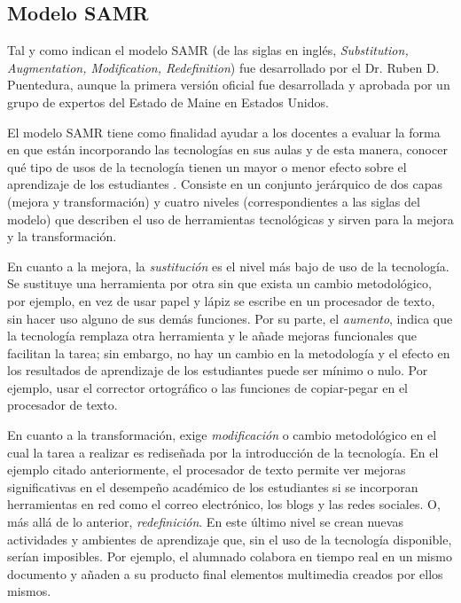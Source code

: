 \documentclass[spanish]{textolivre}
\begin{document}
\subsection{Modelo SAMR}\label{sec-fmt-manuscrito}
Tal y como indican \textcite{garcia-utrera_modelo_2014} el modelo SAMR (de las siglas en inglés, \textit{Substitution, Augmentation, Modification, Redefinition}) fue desarrollado por el Dr. Ruben D. Puentedura, aunque la primera versión oficial fue desarrollada y aprobada por un grupo de expertos del Estado de Maine en Estados Unidos.

El modelo SAMR tiene como finalidad ayudar a los docentes a evaluar la forma en que están incorporando las tecnologías en sus aulas y de esta manera, conocer qué tipo de usos de la tecnología tienen un mayor o menor efecto sobre el aprendizaje de los estudiantes \cite{puentedura_models_2008}. Consiste en un conjunto jerárquico de dos capas (mejora y transformación) y cuatro niveles (correspondientes a las siglas del modelo) que describen el uso de herramientas tecnológicas \cite{garcia-utrera_modelo_2014} y sirven para la mejora y la transformación. 

En cuanto a la mejora, la \textit{sustitución} es el nivel más bajo de uso de la tecnología. Se sustituye una herramienta por otra sin que exista un cambio metodológico, por ejemplo, en vez de usar papel y lápiz se escribe en un procesador de texto, sin hacer uso alguno de sus demás funciones. Por su parte, el \textit{aumento}, indica que la tecnología remplaza otra herramienta y le añade mejoras funcionales que facilitan la tarea; sin embargo, no hay un cambio en la metodología y el efecto en los resultados de aprendizaje de los estudiantes puede ser mínimo o nulo. Por ejemplo, usar el corrector ortográfico o las funciones de copiar-pegar en el procesador de texto.

En cuanto a la transformación, exige \textit{modificación} o cambio metodológico en el cual la tarea a realizar es rediseñada por la introducción de la tecnología. En el ejemplo citado anteriormente, el procesador de texto permite ver mejoras significativas en el desempeño académico de los estudiantes si se incorporan herramientas en red como el correo electrónico, los blogs y las redes sociales. O, más allá de lo anterior, \textit{redefinición}. En este último nivel se crean nuevas actividades y ambientes de aprendizaje que, sin el uso de la tecnología disponible, serían imposibles. Por ejemplo, el alumnado colabora en tiempo real en un mismo documento y añaden a su producto final elementos multimedia creados por ellos mismos.
\end{document}
